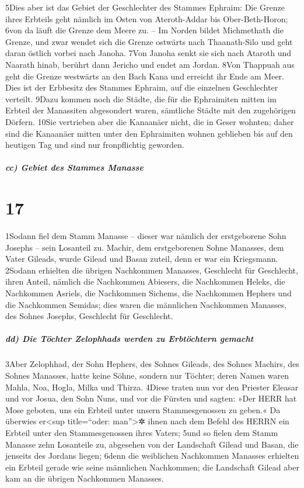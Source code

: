 5Dies aber ist das Gebiet der Geschlechter des Stammes Ephraim: Die
Grenze ihres Erbteils geht nämlich im Osten von Ateroth-Addar bis
Ober-Beth-Horon; 6von da läuft die Grenze dem Meere zu. -- Im Norden
bildet Michmethath die Grenze, und zwar wendet sich die Grenze ostwärts
nach Thaanath-Silo und geht daran östlich vorbei nach Janoha. 7Von
Janoha senkt sie sich nach Ataroth und Naarath hinab, berührt dann
Jericho und endet am Jordan. 8Von Thappuah aus geht die Grenze westwärts
an den Bach Kana und erreicht ihr Ende am Meer. Dies ist der Erbbesitz
des Stammes Ephraim, auf die einzelnen Geschlechter verteilt. 9Dazu
kommen noch die Städte, die für die Ephraimiten mitten im Erbteil der
Manassiten abgesondert waren, sämtliche Städte mit den zugehörigen
Dörfern. 10Sie vertrieben aber die Kanaanäer nicht, die in Geser
wohnten; daher sind die Kanaanäer mitten unter den Ephraimiten wohnen
geblieben bis auf den heutigen Tag und sind nur fronpflichtig geworden.

\hypertarget{cc-gebiet-des-stammes-manasse}{%
\subparagraph{cc) Gebiet des Stammes
Manasse}\label{cc-gebiet-des-stammes-manasse}}

\hypertarget{section-16}{%
\section{17}\label{section-16}}

1Sodann fiel dem Stamm Manasse -- dieser war nämlich der erstgeborene
Sohn Josephs -- sein Losanteil zu. Machir, dem erstgeborenen Sohne
Manasses, dem Vater Gileads, wurde Gilead und Basan zuteil, denn er war
ein Kriegsmann. 2Sodann erhielten die übrigen Nachkommen Manasses,
Geschlecht für Geschlecht, ihren Anteil, nämlich die Nachkommen
Abiesers, die Nachkommen Heleks, die Nachkommen Asriels, die Nachkommen
Sichems, die Nachkommen Hephers und die Nachkommen Semidas; dies waren
die männlichen Nachkommen Manasses, des Sohnes Josephs, Geschlecht für
Geschlecht.

\hypertarget{dd-die-tuxf6chter-zelophhads-werden-zu-erbtuxf6chtern-gemacht}{%
\subparagraph{dd) Die Töchter Zelophhads werden zu Erbtöchtern
gemacht}\label{dd-die-tuxf6chter-zelophhads-werden-zu-erbtuxf6chtern-gemacht}}

3Aber Zelophhad, der Sohn Hephers, des Sohnes Gileads, des Sohnes
Machirs, des Sohnes Manasses, hatte keine Söhne, sondern nur Töchter;
deren Namen waren Mahla, Noa, Hogla, Milka und Thirza. 4Diese traten nun
vor den Priester Eleasar und vor Josua, den Sohn Nuns, und vor die
Fürsten und sagten: »Der HERR hat Mose geboten, uns ein Erbteil unter
unsern Stammesgenossen zu geben.« Da überwies er\textless sup
title=``oder: man''\textgreater✲ ihnen nach dem Befehl des HERRN ein
Erbteil unter den Stammesgenossen ihres Vaters; 5und so fielen dem Stamm
Manasse zehn Losanteile zu, abgesehen von der Landschaft Gilead und
Basan, die jenseits des Jordans liegen; 6denn die weiblichen Nachkommen
Manasses erhielten ein Erbteil gerade wie seine männlichen Nachkommen;
die Landschaft Gilead aber kam an die übrigen Nachkommen Manasses.

